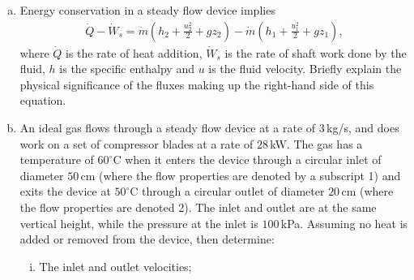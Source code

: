 \documentclass[calculator,datasheet,sample]{exam}
\begin{document}
\begin{question} 
\begin{enumerate}[(a)]
\item Energy conservation in a steady flow device implies
\begin{align*}
 \dot{Q} - \dot{W}_s = \dot{m} \left(h_2 + \frac{u_2^2}{2} + g z_2\right) - \dot{m} \left(h_1 + \frac{u_1^2}{2} + g z_1\right),
\end{align*}
where $\dot{Q}$ is the rate of heat addition, $\dot{W}_s$ is the rate of shaft work done by the fluid, $h$ is the specific enthalpy and $u$ is the fluid velocity. Briefly explain the physical significance of the fluxes making up the right-hand side of this equation. 

\item An ideal gas flows through a steady flow device at a rate of $3$\,kg/s, and does work on a set of compressor blades at a rate of $28$\,kW. The gas has a temperature of $60^\circ$C when it enters the device through a circular inlet of diameter $50$\,cm (where the flow properties are denoted by a subscript 1) and exits the device at $50^\circ$C through a circular outlet of diameter $20$\,cm (where the flow properties are denoted 2). The inlet and outlet are at the same vertical height, while the pressure at the inlet is $100$\,kPa. Assuming no heat is added or removed from the device, then determine:

\begin{enumerate}[i)]
\item The inlet and outlet velocities; 
\end{enumerate}
\end{enumerate}
\end{question}
\end{document}

